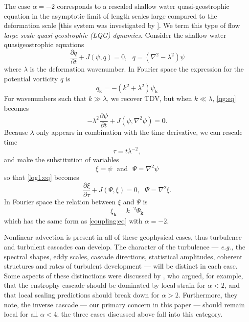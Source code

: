 \documentclass{jfm}
\newcommand{\eg}  {\textit{e.g., }}
\newcommand{\kb}  {\boldsymbol{k}}
\newcommand{\del} {\nabla}
\newcommand{\p}   {\partial}
\newcommand{\pp}  [2]{\frac{\p #1}{\p #2}}
\begin{document}
\begin{narrower}

\noindent The case $\alpha=-2$ corresponds to a rescaled shallow water
quasi-geostrophic equation in the asymptotic limit of length scales
large compared to the deformation scale [this system was
investigated by \citet{Larichev91}]. We term this type of flow
\textit{large-scale quasi-geostrophic (LQG) dynamics.} Consider the
shallow water qua\-si\-geo\-stro\-phic equations
\begin{equation}
\pp{q}{t} + J(\psi,q) = 0, ~~~ q = (\del^2 - \lambda^2) \psi
\label{qg:eq}
\end{equation}
where $\lambda$ is the deformation wavenumber.  In Fourier space the
expression for the potential vorticity $q$ is
\begin{equation}
q_{\kb} = -(k^2 + \lambda^2) \psi_{\kb}
\label{qk:eq}
\end{equation}
For wavenumbers such that $k\gg \lambda$, we recover TDV, but when
$k\ll \lambda$, \eqref{qg:eq} becomes
\begin{equation}
-\lambda^2\pp{\psi}{t} + J(\psi,\del^2 \psi) = 0.
\label{lqg1:eq}
\end{equation}
Because $\lambda$ only appears in combination with the time derivative,
we can rescale time
\begin{equation}
\tau = t\lambda^{-2},
\label{tau:eq}
\end{equation}
and make the substitution of variables
\begin{equation}
\xi =  \psi ~~~ \textrm{and}~~~ \Psi = \del^2 \psi
\label{lqgvar:eq}
\end{equation}
so that \eqref{lqg1:eq} becomes
\begin{equation}
\pp{\xi}{\tau} + J(\Psi,\xi) = 0,~~~\Psi = \del^2 \xi.
\label{lqg3:eq}
\end{equation}
In Fourier space the relation between $\xi$ and $\Psi$ is
\begin{equation}
\xi_{\kb} = k^{-2}\Psi_{\kb}
\label{xik:eq}
\end{equation}
which has the same form as \eqref{coupling:eq} with $\alpha=-2$.

\end{narrower}

\bigskip

Nonlinear advection is present in all of these geophysical cases, thus
turbulence and turbulent cascades can develop.  The character of the
turbulence --- \eg the spectral shapes, eddy scales, cascade
directions, statistical amplitudes, coherent structures and rates of
turbulent development --- will be distinct in each case.  Some aspects
of these distinctions were discussed by \citet{Pierrehumbert94}, who
argued, for example, that the enstrophy cascade should be dominated by
local strain for $\alpha<2$, and that local scaling predictions should
break down for $\alpha>2$.  Furthermore, they note, the inverse
cascade --- our primary concern in this paper --- should remain local
for all $\alpha<4$; the three cases discussed above fall into this
category.
\end{document}
